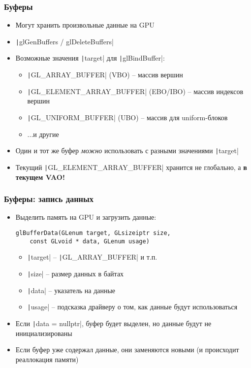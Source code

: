 \documentclass[10pt]{beamer}
\begin{document}
\begin{frame}[fragile]
\frametitle{Буферы}
\begin{itemize}
\item Могут хранить произвольные данные на GPU
\pause
\item \texttt|glGenBuffers / glDeleteBuffers|
\pause
\item Возможные значения \texttt|target| для \texttt|glBindBuffer|:
\begin{itemize}
\item \texttt|GL_ARRAY_BUFFER| (VBO) -- массив вершин
\pause
\item \texttt|GL_ELEMENT_ARRAY_BUFFER| (EBO/IBO) -- массив индексов вершин
\pause
\item \texttt|GL_UNIFORM_BUFFER| (UBO) -- массив для uniform-блоков
\pause
\item ...и другие
\end{itemize}
\pause
\item Один и тот же буфер \textit{можно} использовать с разными значениями \texttt|target|
\pause
\item Текущий \texttt|GL_ELEMENT_ARRAY_BUFFER| хранится не глобально, а \alert{\textbf{в текущем VAO!}}
\end{itemize}
\end{frame}

\begin{frame}[fragile]
\frametitle{Буферы: запись данных}
\begin{itemize}
\item Выделить память на GPU и загрузить данные:
\begin{verbatim}
glBufferData(GLenum target, GLsizeiptr size,
    const GLvoid * data, GLenum usage)
\end{verbatim}
\begin{itemize}
\item \texttt|target| -- \texttt|GL_ARRAY_BUFFER| и т.п.
\item \texttt|size| -- размер данных в байтах
\item \texttt|data| -- указатель на данные
\item \texttt|usage| -- подсказка драйверу о том, как данные будут использоваться
\end{itemize}
\pause
\item Если \texttt|data = nullptr|, буфер будет выделен, но данные будут не инициализированы
\pause
\item Если буфер уже содержал данные, они заменяются новыми (и происходит реаллокация памяти)
\end{itemize}
\end{frame}
\end{document}
